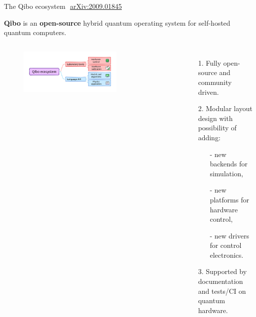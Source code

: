 \documentclass[8pt, xcolor={svgnames}, hyperref={linkcolor=black}]{beamer}
\begin{document}
\begin{frame}{The Qibo ecosystem\hfill \faBook\,\, \href{https://arxiv.org/abs/2009.01845}{arXiv:2009.01845}}

   \textbf{Qibo} is an \textbf{open-source} hybrid quantum operating system for self-hosted quantum computers.
   \begin{columns}
     \column{6cm}
     \begin{figure}
       \includegraphics[width=0.7\textwidth]{figures/overview.png}
     \end{figure}
     \vspace{-0.5cm}
   \begin{itemize}
     \item[1.] Fully open-source and community driven.
     \item[2.] Modular layout design with possibility of adding:
     \begin{itemize}[noitemsep]
       \item[-] new backends for simulation,
       \item[-] new platforms for hardware control,
       \item[-] new drivers for control electronics.
     \end{itemize}
     \item[3.] Supported by documentation and tests/CI on quantum hardware.
   \end{itemize}


\end{columns}
\end{frame}
\end{document}
